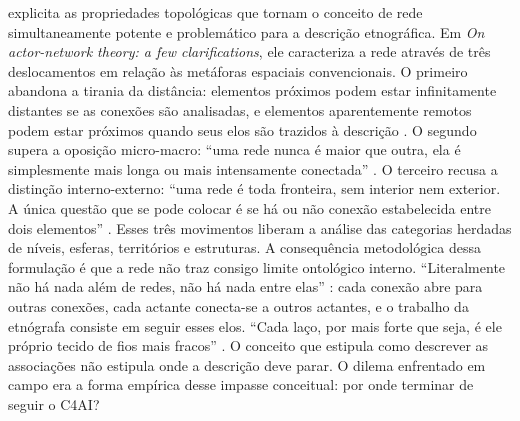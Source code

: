 \textcite{latour1996clarifications} explicita as propriedades topológicas que tornam o conceito de rede simultaneamente potente e problemático para a descrição etnográfica. Em \textit{On actor-network theory: a few clarifications}, ele caracteriza a rede através de três deslocamentos em relação às metáforas espaciais convencionais. O primeiro abandona a tirania da distância: elementos próximos podem estar infinitamente distantes se as conexões são analisadas, e elementos aparentemente remotos podem estar próximos quando seus elos são trazidos à descrição \parencite[p.~4]{latour1996clarifications}. O segundo supera a oposição micro-macro: ``uma rede nunca é maior que outra, ela é simplesmente mais longa ou mais intensamente conectada'' \parencite[p.~5]{latour1996clarifications}. O terceiro recusa a distinção interno-externo: ``uma rede é toda fronteira, sem interior nem exterior. A única questão que se pode colocar é se há ou não conexão estabelecida entre dois elementos'' \parencite[p.~6]{latour1996clarifications}. Esses três movimentos liberam a análise das categorias herdadas de níveis, esferas, territórios e estruturas. A consequência metodológica dessa formulação é que a rede não traz consigo limite ontológico interno. ``Literalmente não há nada além de redes, não há nada entre elas'' \parencite[p.~4]{latour1996clarifications}: cada conexão abre para outras conexões, cada actante conecta-se a outros actantes, e o trabalho da etnógrafa consiste em seguir esses elos. ``Cada laço, por mais forte que seja, é ele próprio tecido de fios mais fracos'' \parencite[p.~3]{latour1996clarifications}. O conceito que estipula como descrever as associações não estipula onde a descrição deve parar. O dilema enfrentado em campo era a forma empírica desse impasse conceitual: por onde terminar de seguir o C4AI?

